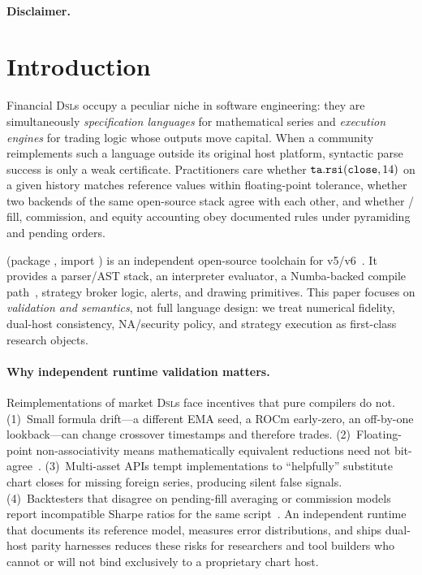 \documentclass[11pt,a4paper]{article}
\begin{document}
\paragraph{Disclaimer.}
\trademarknote{}

\tableofcontents
\newpage

\section{Introduction}
\label{sec:intro}

Financial \textsc{Dsl}s occupy a peculiar niche in software engineering:
they are simultaneously \emph{specification languages} for mathematical series
and \emph{execution engines} for trading logic whose outputs move capital.
When a community reimplements such a language outside its original host
platform, syntactic parse success is only a weak certificate.
Practitioners care whether $\texttt{ta}{}.\texttt{rsi}(\texttt{close},14)$ on a given
\ohlcv{} history matches reference values within floating-point tolerance,
whether two backends of the same open-source stack agree with each other,
and whether / fill, commission, and
equity accounting obey documented rules under pyramiding and pending orders.

\pyne{} (package , import ) is an independent
open-source toolchain for \pine{} v5/v6~\citep{pynescript2026,tradingview-pine}.
It provides a parser/AST stack, an interpreter evaluator, a Numba-backed
compile path~\citep{lam2015numba,lattner2004llvm}, strategy broker logic,
alerts, and drawing primitives.
This paper focuses on \emph{validation and semantics}, not full language
design: we treat numerical fidelity, dual-host consistency, NA/security policy,
and strategy execution as first-class research objects.

\paragraph{Why independent runtime validation matters.}
Reimplementations of market \textsc{Dsl}s face incentives that pure compilers
do not.
(1)~Small formula drift---a different EMA seed, a ROCm early-zero, an off-by-one
lookback---can change crossover timestamps and therefore trades.
(2)~Floating-point non-associativity means mathematically equivalent reductions
need not bit-agree~\citep{higham2002accuracy,press2007numerical,ieee754}.
(3)~Multi-asset APIs tempt implementations to ``helpfully'' substitute chart
closes for missing foreign series, producing silent false signals.
(4)~Backtesters that disagree on pending-fill averaging or commission models
report incompatible Sharpe ratios for the same script~\citep{tsay2010analysis}.
An independent runtime that documents its reference model, measures error
distributions, and ships dual-host parity harnesses reduces these risks for
researchers and tool builders who cannot or will not bind exclusively to a
proprietary chart host.
\end{document}
